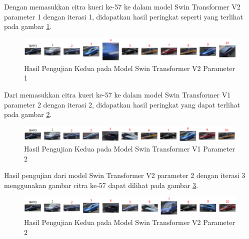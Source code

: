 Dengan memasukkan citra kueri ke-57 ke dalam model Swin Transformer V2 parameter 1 dengan iterasi 1, didapatkan hasil 
peringkat seperti yang terlihat pada gambar \ref{fig:hasilpengujiankeduapadamodelswintransformerv2param1}.

\begin{figure}[h!]
  \centering
  \includegraphics[scale=0.6]{gambar/Que57V2P1IT1.png}
  \caption{Hasil Pengujian Kedua pada Model Swin Transformer V2 Parameter 1}
  \label{fig:hasilpengujiankeduapadamodelswintransformerv2param1}
\end{figure}

Dari memasukkan citra kueri ke-57 ke dalam model Swin Transformer V1 parameter 2 dengan iterasi 2, didapatkan hasil 
peringkat yang dapat terlihat pada gambar \ref{fig:hasilpengujiankeduapadamodelswintransformerv1param2}.

\begin{figure}[h!]
  \centering
  \includegraphics[scale=0.6]{gambar/Que57V1P2IT2.png}
  \caption{Hasil Pengujian Kedua pada Model Swin Transformer V1 Parameter 2}
  \label{fig:hasilpengujiankeduapadamodelswintransformerv1param2}
\end{figure}

Hasil pengujian dari model Swin Transformer V2 parameter 2 dengan iterasi 3 menggunakan gambar citra ke-57 dapat 
dilihat pada gambar \ref{fig:hasilpengujiankeduapadamodelswintransformerv2param2}.

\begin{figure}[h!]
  \centering
  \includegraphics[scale=0.6]{gambar/Que57V2P2IT3.png}
  \caption{Hasil Pengujian Kedua pada Model Swin Transformer V2 Parameter 2}
  \label{fig:hasilpengujiankeduapadamodelswintransformerv2param2}
\end{figure}

